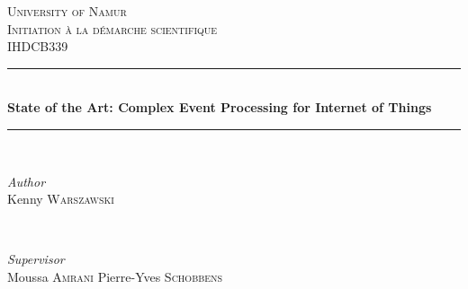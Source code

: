 \documentclass[11pt]{article}
\begin{document}

\begin{titlepage} %
	\newcommand{\HRule}{\rule{\linewidth}{0.5mm}} %
	
	\center %
	
	
	\textsc{\LARGE University of Namur}\\[1.5cm] %
	
	\textsc{\Large Initiation à la démarche scientifique}\\[0.5cm] %
	
	\textsc{\large IHDCB339}\\[0.5cm] %
	
	
	\HRule\\[0.4cm]
	
	{\huge\bfseries State of the Art: Complex Event Processing for Internet of Things}\\[0.4cm] %
	
	\HRule\\[1.5cm]
	
	
	\begin{minipage}{0.4\textwidth}
		\begin{flushleft}
			\large
			\textit{Author}\\
			Kenny \textsc{Warszawski} %
		\end{flushleft}
	\end{minipage}
	~
	\begin{minipage}{0.4\textwidth}
		\begin{flushright}
			\large
			\textit{Supervisor}\\
			Moussa \textsc{Amrani} %
			\newline
			Pierre-Yves \textsc{Schobbens} %
		\end{flushright}
	\end{minipage}
	

\end{titlepage}
\end{document}
